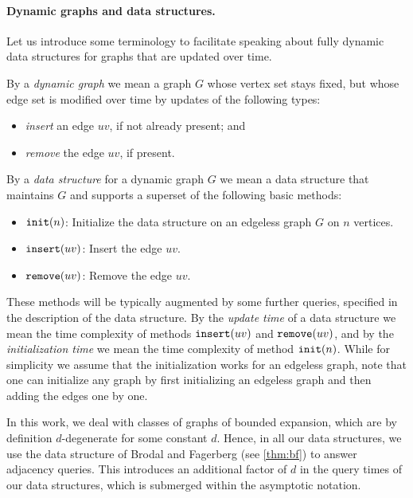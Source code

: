 \paragraph*{Dynamic graphs and data structures.} Let us introduce some terminology to facilitate speaking about fully dynamic data structures for graphs that are updated over time.

By a \emph{dynamic graph} we mean a graph $G$ whose vertex set stays fixed, but whose edge set is modified over time by updates of the following types:
\begin{itemize}
	\item \emph{insert} an edge $uv$, if not already present; and
	\item \emph{remove} the edge $uv$, if present.
\end{itemize}
By a \emph{data structure} for a dynamic graph $G$ we mean a data structure that maintains $G$ and supports a superset of the following basic methods:
\begin{itemize}
	\item $\mathtt{init}(n)$: Initialize the data structure on an edgeless graph $G$ on $n$ vertices.
	\item $\mathtt{insert}(uv)$: Insert the edge $uv$.
	\item $\mathtt{remove}(uv)$: Remove the edge $uv$.
\end{itemize}
These methods will be typically augmented by some further queries, specified in the description of the data structure. By the \emph{update time} of a data structure we mean the time complexity of methods $\mathtt{insert}(uv)$ and $\mathtt{remove}(uv)$, and by the \emph{initialization time} we mean the time complexity of method $\mathtt{init}(n)$. While for simplicity we assume that the initialization works for an edgeless graph, note that one can initialize any graph by first initializing an edgeless graph and then adding the edges one by one.

In this work, we deal with classes of graphs of bounded expansion, which are by definition $d$-degenerate for some constant $d$. Hence, in all our data structures, we use the data structure of Brodal and Fagerberg (see \cref{thm:bf}) to answer adjacency queries. This introduces an additional factor of $d$ in the query times of our data structures, which is submerged within the asymptotic notation.

